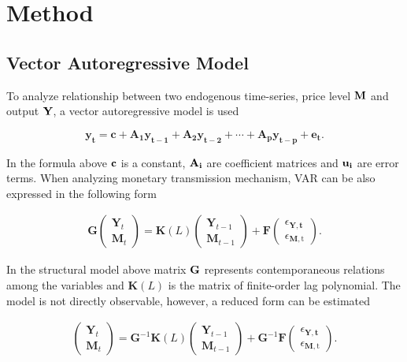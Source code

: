\documentclass[a4paper,12pt]{article}
\begin{document}
\section{Method}
\subsection{Vector Autoregressive Model}

To analyze relationship between two endogenous time-series, price level \(\bf M\) and output \(\bf Y\), a vector autoregressive model is used

\begin{equation} \label{eq:1}
		{\mathbf{y_{t}=c+A_{1}y_{{t-1}}+A_{2}y_{{t-2}}+\cdots +A_{p}y_{{t-p}}+e_{t}}}.
\end{equation}

In the formula above \(\bf c\) is a constant, \(\bf A_i\) are coefficient matrices and \(\bf u_i\) are error terms. When analyzing monetary transmission mechanism, VAR can be also expressed in the following form \citep{favero2001}

\begin{equation} \label{eq:2}
\begin{split}
		\mathbf{G}\left(\begin{array}{c}
		\mathbf{Y}_{t} \\
		\mathbf{M}_{t}
		\end{array}\right)=\mathbf{K}(L)\left(\begin{array}{c}
		\mathbf{Y}_{t-1} \\
		\mathbf{M}_{t-1}
		\end{array}\right)+\mathbf{F}\left(\begin{array}{c}
		\epsilon_{\mathbf{Y}, \mathbf{t}} \\
		\epsilon_{\mathbf{M}, \mathrm{t}}
		\end{array}\right).
\end{split}
\end{equation}

In the structural model above matrix \(\bf G\) represents contemporaneous relations among the variables and \(\mathbf{K}(L)\) is the matrix of finite-order lag polynomial. The model is not directly observable, however, a reduced form can be estimated

\begin{equation} \label{eq:3}
\begin{split}
		\left(\begin{array}{c}
		\mathbf{Y}_{t} \\
		\mathbf{M}_{t}
		\end{array}\right)=\mathbf{G}^{-1} \mathbf{K}(L)\left(\begin{array}{c}
		\mathbf{Y}_{t-1} \\
		\mathbf{M}_{t-1}
		\end{array}\right)+\mathbf{G}^{-1} \mathbf{F}\left(\begin{array}{c}
		\epsilon_{\mathbf{Y}, \mathbf{t}} \\
		\epsilon_{\mathbf{M}, \mathrm{t}}
		\end{array}\right).
\end{split}
\end{equation}
\end{document}
